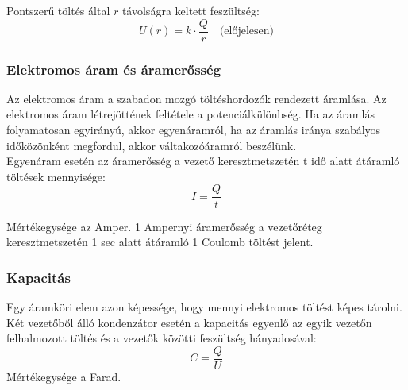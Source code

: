 Pontszerű töltés által $r$ távolságra keltett feszültség:
$$U(r)=k\cdot\frac{Q}{r} \quad \text{(előjelesen)}$$

\subsubsection{Elektromos áram és áramerősség}
Az elektromos áram a szabadon mozgó töltéshordozók rendezett áramlása. Az elektromos áram létrejöttének feltétele a potenciálkülönbség. Ha az áramlás folyamatosan egyirányú, akkor egyenáramról, ha az áramlás iránya szabályos időközönként megfordul, akkor váltakozóáramról beszélünk.\\
Egyenáram esetén az áramerősség a vezető keresztmetszetén t idő alatt átáramló töltések mennyisége:
$$ I = \frac{Q}{t}$$

Mértékegysége az Amper.
1 Ampernyi áramerősség a vezetőréteg keresztmetszetén 1 sec alatt átáramló 1 Coulomb töltést jelent.

\subsubsection{Kapacitás}
Egy áramköri elem azon képessége, hogy mennyi elektromos töltést képes tárolni. Két vezetőből álló kondenzátor esetén a kapacitás egyenlő az egyik vezetőn felhalmozott töltés és a vezetők közötti feszültség hányadosával:
$$ C = \frac{Q}{U} $$
Mértékegysége a Farad.

